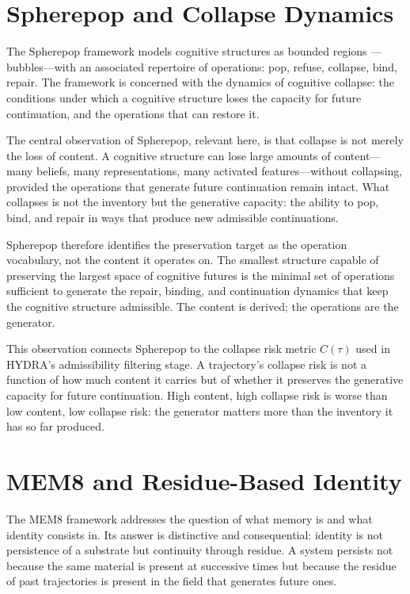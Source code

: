 \documentclass[12pt, oneside]{book}
\theoremstyle{flyxion}
\theoremstyle{definition}
\begin{document}
\section{Spherepop and Collapse Dynamics}

The Spherepop framework models cognitive structures as bounded regions
---bubbles---with an associated repertoire of operations: pop, refuse,
collapse, bind, repair. The framework is concerned with the dynamics
of cognitive collapse: the conditions under which a cognitive structure
loses the capacity for future continuation, and the operations that
can restore it.

The central observation of Spherepop, relevant here, is that collapse
is not merely the loss of content. A cognitive structure can lose
large amounts of content---many beliefs, many representations, many
activated features---without collapsing, provided the operations that
generate future continuation remain intact. What collapses is not the
inventory but the generative capacity: the ability to pop, bind, and
repair in ways that produce new admissible continuations.

Spherepop therefore identifies the preservation target as the
operation vocabulary, not the content it operates on. The smallest
structure capable of preserving the largest space of cognitive futures
is the minimal set of operations sufficient to generate the repair,
binding, and continuation dynamics that keep the cognitive structure
admissible. The content is derived; the operations are the generator.

This observation connects Spherepop to the collapse risk metric
$C(\tau)$ used in HYDRA's admissibility filtering stage. A
trajectory's collapse risk is not a function of how much content it
carries but of whether it preserves the generative capacity for
future continuation. High content, high collapse risk is worse
than low content, low collapse risk: the generator matters more
than the inventory it has so far produced.

\section{MEM\textbar{}8 and Residue-Based Identity}

The MEM\textbar{}8 framework addresses the question of what memory
is and what identity consists in. Its answer is distinctive and
consequential: identity is not persistence of a substrate but
continuity through residue. A system persists not because the same
material is present at successive times but because the residue
of past trajectories is present in the field that generates future
ones.
\end{document}
